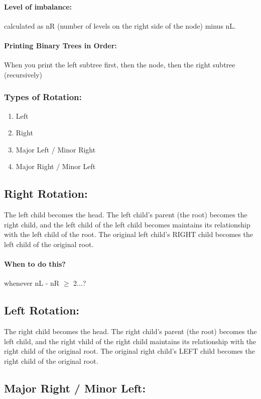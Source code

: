 \documentclass[a4paper,12pt]{report}
\begin{document}
\paragraph{Level of imbalance: } calculated as nR (number of levels on the right side of the node) minus nL.
\paragraph{Printing Binary Trees in Order: } When you print the left subtree first, then the node, then the right subtree (recursively)
\subsubsection{Types of Rotation: }
\begin{enumerate}
\item Left
\item Right
\item Major Left / Minor Right
\item Major Right / Minor Left
\end{enumerate}

\subsection{Right Rotation: }
The left child becomes the head. The left child's parent (the root) becomes the right child, and the left child of the left child becomes maintains its relationship with the left child of the root. The original left child's RIGHT child becomes the left child of the original root. 
\paragraph{When to do this? } whenever nL - nR $\geq$ 2...?

\subsection{Left Rotation: }
The right child becomes the head. The right child's parent (the root) becomes the left child, and the right vhild of the right child maintains its relationship with the right child of the original root. The original right child's LEFT child becomes the right child of the original root. 

\subsection{Major Right / Minor Left: }
\end{document}
